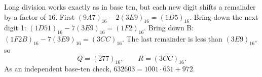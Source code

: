 Long division works exactly as in base ten, but each new digit shifts a remainder by a factor of $ 16 $. First $(9A7)_{16}-2(3E9)_{16}=(1D5)_{16}$. Bring down the next digit 1: $(1D51)_{16}-7(3E9)_{16}=(1F2)_{16}$. Bring down B: $(1F2B)_{16}-7(3E9)_{16}=(3CC)_{16}$. The last remainder is less than $(3E9)_{16}$, so \[\boxed{Q=(277)_{16},\qquad R=(3CC)_{16}}.\]As an independent base-ten check, $ 632603=1001\cdot631+972 $.
